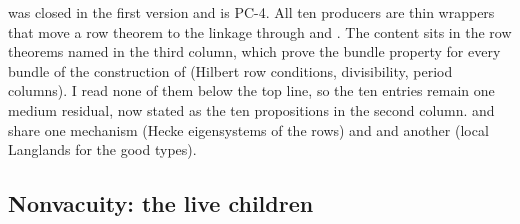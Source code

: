 \documentclass[11pt]{article}
\newcommand{\PC}[1]{\textsf{PC-#1}}
\theoremstyle{remark}
\begin{document}
\noindent {} was closed in the first version and  is \PC{4}. All ten producers are thin wrappers that move a row theorem to the linkage through  and . The content sits in the row theorems named in the third column, which prove the bundle property for every bundle of the construction of  (Hilbert row conditions, divisibility, period columns). I read none of them below the top line, so the ten entries remain one medium residual, now stated as the ten propositions in the second column.  and  share one mechanism (Hecke eigensystems of the rows) and  and  another (local Langlands for the good types).

\subsection{Nonvacuity: the live children}\label{sec:fu2nonvac}
\end{document}
